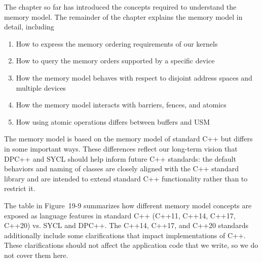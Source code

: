 The chapter so far has introduced the concepts required to understand the memory model. The remainder of the chapter explains the memory model in detail, including\par

\begin{enumerate}
	\item How to express the memory ordering requirements of 	our kernels
	\item How to query the memory orders supported by a 	specific device
	\item How the memory model behaves with respect to 	disjoint address spaces and multiple devices
	\item How the memory model interacts with barriers, fences, and atomics
	\item How using atomic operations differs between buffers and USM
\end{enumerate}

The memory model is based on the memory model of standard C++ but differs in some important ways. These differences reflect our long-term vision that DPC++ and SYCL should help inform future C++ standards: the default behaviors and naming of classes are closely aligned with the C++ standard library and are intended to extend standard C++ functionality rather than to restrict it.\par

The table in Figure 19-9 summarizes how different memory model concepts are exposed as language features in standard C++ (C++11, C++14, C++17, C++20) vs. SYCL and DPC++. The C++14, C++17, and C++20 standards additionally include some clarifications that impact implementations of C++. These clarifications should not affect the application code that we write, so we do not cover them here.\par

